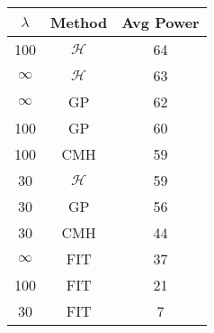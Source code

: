 \centering \begin{tabular}{c|c|c}
$\lambda$	&Method	&Avg Power\\\hline
100	&$\mathcal{H}$	&64\\
$\infty$	&$\mathcal{H}$	&63\\
$\infty$	&GP	&62\\
100	&GP	&60\\
100	&CMH	&59\\
30	&$\mathcal{H}$	&59\\
30	&GP	&56\\
30	&CMH	&44\\
$\infty$	&FIT	&37\\
100	&FIT	&21\\
30	&FIT	&7\\
\end{tabular}
